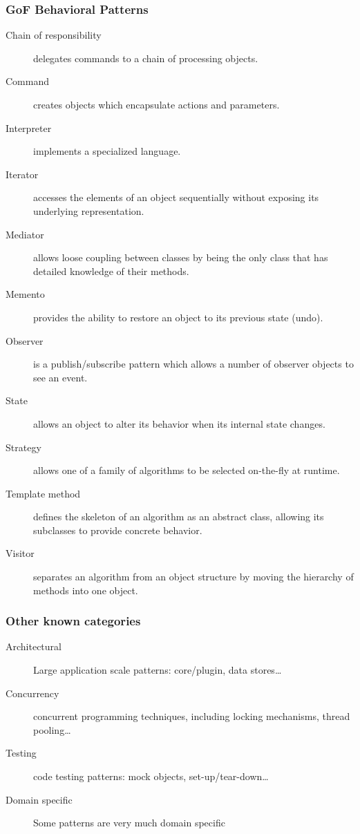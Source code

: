 \documentclass{beamer}
\begin{document}
\begin{frame}
\frametitle {GoF Behavioral Patterns}

\begin{scriptsize}
\begin{description}
 \item [Chain of responsibility] delegates commands to a chain of processing objects.
 \item [Command] creates objects which encapsulate actions and parameters.
 \item [Interpreter] implements a specialized language.
 \item [Iterator] accesses the elements of an object sequentially without exposing its underlying representation.
 \item [Mediator] allows loose coupling between classes by being the only class that has detailed knowledge of their methods.
 \item [Memento] provides the ability to restore an object to its previous state (undo).
 \item [Observer] is a publish/subscribe pattern which allows a number of observer objects to see an event.
 \item [State] allows an object to alter its behavior when its internal state changes.
 \item [Strategy] allows one of a family of algorithms to be selected on-the-fly at runtime.
 \item [Template method] defines the skeleton of an algorithm as an abstract class, allowing its subclasses to provide concrete behavior.
 \item [Visitor] separates an algorithm from an object structure by moving the hierarchy of methods into one object.
\end{description}  
\end{scriptsize}
\end{frame}

\begin{frame}
\frametitle {Other known categories}

\begin{description}
 \item [Architectural] Large application scale patterns: core/plugin, data stores\dots
 \item [Concurrency] concurrent programming techniques, including locking mechanisms, thread pooling\dots
 \item [Testing] code testing patterns: mock objects, set-up/tear-down\dots
 \item [Domain specific] Some patterns are very much domain specific
\end{description}  
\end{frame}
\end{document}
